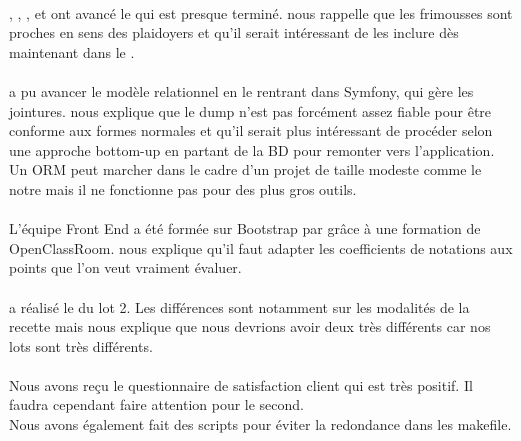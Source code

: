 \documentclass [a4paper] {article}
\begin{document}
\paragraph*{}
\Melissa, \Matthieu, \Michel, \Julie{} et \Florian{} ont avancé le \DCP{} qui est presque terminé. \nomTuteurPedago{} nous rappelle que les frimousses sont proches en sens des plaidoyers et qu'il serait intéressant de les inclure dès maintenant dans le \DCP{}.

\paragraph*{}
\Kafui{} a pu avancer le modèle relationnel en le rentrant dans Symfony, qui gère les jointures. \nomTuteurPedago{} nous explique que le dump n'est pas forcément assez fiable pour être conforme aux formes normales et qu'il serait plus intéressant de procéder selon une approche bottom-up en partant de la BD pour remonter vers l'application. Un ORM peut marcher dans le cadre d'un projet de taille modeste comme le notre mais il ne fonctionne pas pour des plus gros outils.

\paragraph*{}
L'équipe Front End a été formée sur Bootstrap par \Matthieu{} grâce à une formation de OpenClassRoom. \nomTuteurPedago{} nous explique qu'il faut adapter les coefficients de notations aux points que l'on veut vraiment évaluer.

\paragraph*{}
\Michel{} a réalisé le \PTV{} du lot 2. Les différences sont notamment sur les modalités de la recette mais \nomTuteurPedago{} nous explique que nous devrions avoir deux \PTVCourt{} très différents car nos lots sont très différents.

\paragraph*{}
Nous avons reçu le questionnaire de satisfaction client qui est très positif. Il faudra cependant faire attention pour le second. \\
Nous avons également fait des scripts pour éviter la redondance dans les makefile.

\newpage
\end{document}
